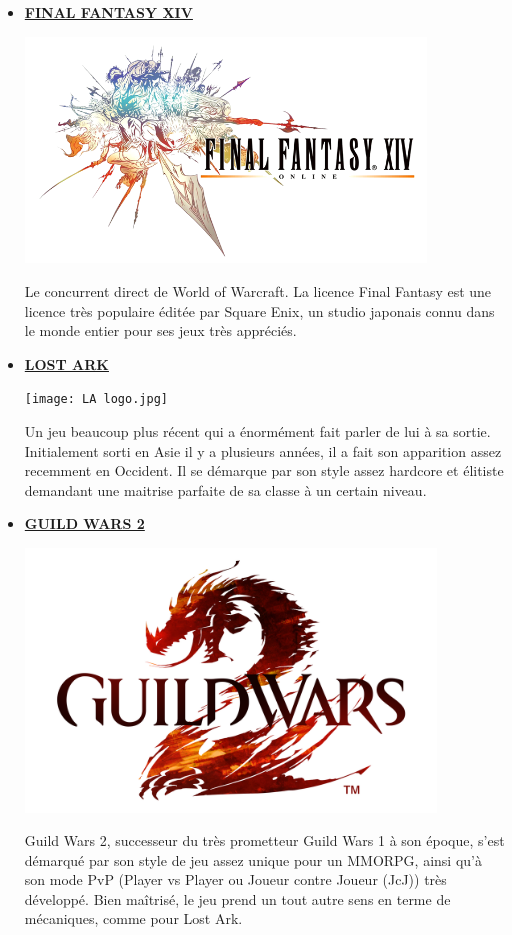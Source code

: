 \documentclass{article}
\begin{document}
\begin{itemize}
    \item \href{https://fr.finalfantasyxiv.com/}{\textbf{FINAL FANTASY XIV}}\medskip

          \includegraphics*[height=6cm]{FFXIV logo.png}

          Le concurrent direct de World of Warcraft. La licence
          Final Fantasy est une licence très populaire éditée par Square Enix, un studio
          japonais connu dans le monde entier pour ses jeux très appréciés. \pagebreak

    \item \href{https://www.playlostark.com/fr-fr/}{\textbf{LOST ARK}}\medskip

          \texttt{[image: LA logo.jpg]}

          Un jeu beaucoup plus récent qui a énormément fait parler de lui à sa sortie.
          Initialement sorti en Asie il y a plusieurs années, il a fait son apparition
          assez recemment en Occident. Il se démarque par son style assez hardcore et
          élitiste demandant une maitrise parfaite de sa classe à un certain niveau.\medskip

    \item \href{https://www.guildwars2.com/fr/}{\textbf{GUILD WARS 2}}\medskip

          \includegraphics*[height=7cm]{GW2 logo.png}

          Guild Wars 2, successeur du très prometteur Guild Wars 1 à son époque, s'est
          démarqué par son style de jeu assez unique pour un MMORPG, ainsi qu'à son mode
          PvP (Player vs Player ou Joueur contre Joueur (JcJ)) très développé. Bien
          maîtrisé, le jeu prend un tout autre sens en terme de mécaniques, comme pour
          Lost Ark.
\end{itemize}
\end{document}
